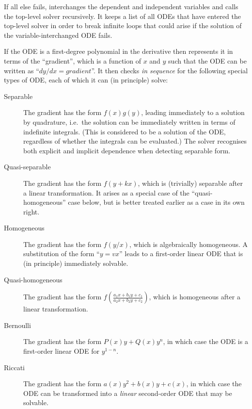 If all else fails,  interchanges the dependent and
independent variables and calls the top-level solver recursively.  It
keeps a list of all ODEs that have entered the top-level solver in
order to break infinite loops that could arise if the solution of the
variable-interchanged ODE fails.



If the ODE is a first-degree polynomial in the derivative then
 represents it in terms of the ``gradient'', which is a
function of $x$ and $y$ such that the ODE can be written as ``$dy/dx =
\textit{gradient}$''.  It then checks \emph{in sequence} for the
following special types of ODE, each of which it can (in principle)
solve:
\begin{description}
\item[Separable] The gradient has the form $f(x)g(y)$, leading
immediately to a solution by quadrature, i.e.\ the solution can be
immediately written in terms of indefinite integrals.  (This is
considered to be a solution of the ODE, regardless of whether the
integrals can be evaluated.)  The solver recognises both explicit and
implicit dependence when detecting separable form.

\item[Quasi-separable] The gradient has the form $f(y+kx)$, which is
(trivially) separable after a linear transformation.  It arises as a
special case of the ``quasi-homogeneous'' case below, but is better
treated earlier as a case in its own right.

\item[Homogeneous] The gradient has the form $f(y/x)$, which is
algebraically homogeneous.  A substitution of the form ``$y = vx$''
leads to a first-order linear ODE that is (in principle) immediately
solvable.

\item[Quasi-homogeneous] The gradient has the form $f(\frac{a_1x +
b_1y + c_1}{a_2x + b_2y + c_2})$, which is homogeneous after a linear
transformation.

\item[Bernoulli] The gradient has the form $P(x) y + Q(x) y^n$, in
which case the ODE is a first-order linear ODE for $y^{1-n}$.

\item[Riccati] The gradient has the form $a(x)y^2 + b(x)y + c(x)$, in
which case the ODE can be transformed into a \emph{linear}
second-order ODE that may be solvable.
\end{description}

